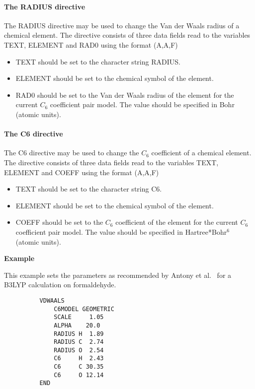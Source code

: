 \documentclass[11pt,fleqn]{article}
\begin{document}
\paragraph{The RADIUS directive}

The RADIUS directive may be used to change the Van der Waals radius of a
chemical element.
The directive consists of three data fields read
to the variables TEXT, ELEMENT and RAD0 using the format (A,A,F)
\begin{itemize}
\item TEXT should be set to the character string RADIUS.
\item ELEMENT should be set to the chemical symbol of the element.
\item RAD0 should be set to the Van der Waals radius of the element for the
      current $C_6$ coefficient pair model. The value should be specified in
      Bohr (atomic units).
\end{itemize}

\paragraph{The C6 directive}

The C6 directive may be used to change the $C_6$ coefficient of a
chemical element.
The directive consists of three data fields read
to the variables TEXT, ELEMENT and COEFF using the format (A,A,F)
\begin{itemize}
\item TEXT should be set to the character string C6.
\item ELEMENT should be set to the chemical symbol of the element.
\item COEFF should be set to the $C_6$ coefficient of the element for the
      current $C_6$ coefficient pair model. The value should be specified in
      Hartree*Bohr$^6$ (atomic units).
\end{itemize}

{\bf Example}

This example sets the parameters as recommended by Antony et al.~\cite{antony06}
for a B3LYP calculation on formaldehyde.
{
\footnotesize
\begin{verbatim}
          VDWAALS
              C6MODEL GEOMETRIC
              SCALE     1.05
              ALPHA    20.0
              RADIUS H  1.89
              RADIUS C  2.74
              RADIUS O  2.54
              C6     H  2.43
              C6     C 30.35
              C6     O 12.14
          END
\end{verbatim}
}
\end{document}
